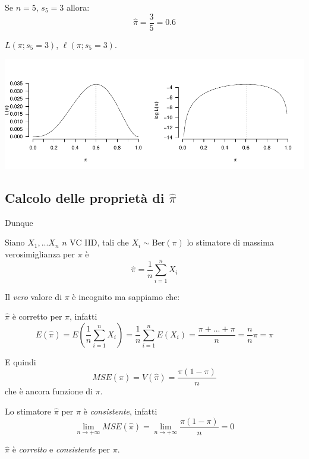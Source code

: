 \documentclass[
  11pt,
]{book}
\theoremstyle{mytheoremstyle}
\theoremstyle{mydefstyle}
\begin{document}
Se \(n=5\), \(s_5=3\) allora:
\[\hat\pi=\frac{3}{5}=0.6\]

\(L(\pi;s_5=3)\), \(\ell(\pi;s_5=3)\).

\begin{center}\includegraphics{Appunti_di_Statistica_2025_files/figure-latex/12-Verosimiglianza-12-1} \end{center}

\subsection{\texorpdfstring{Calcolo delle proprietà di \(\hat\pi\)}{Calcolo delle proprietà di \textbackslash hat\textbackslash pi}}\label{calcolo-delle-proprietuxe0-di-hatpi}

Dunque

\begin{info}
Siano \(X_1,...X_n\) \(n\) VC IID, tali che \(X_i\sim\text{Ber}(\pi)\) lo stimatore
di massima verosimiglianza per \(\pi\) è
\[\hat \pi=\frac 1n \sum_{i=1}^nX_i\]

\end{info}

Il \emph{vero} valore di \(\pi\) è incognito ma sappiamo che:

\begin{info}
\(\hat\pi\) è corretto per \(\pi\), infatti
\[E(\hat\pi)=E\left(\frac{1}n\sum_{i=1}^n X_i\right)=\frac{1}n\sum_{i=1}^nE(X_i)=\frac{\pi+...+\pi}{n}=\frac n n\pi=\pi\]

E quindi
\[MSE(\hat\pi)=V(\hat\pi)=\frac{\pi(1-\pi)}{n}\]
che è ancora funzione di \(\pi\).

\end{info}

\begin{info}
Lo stimatore \(\hat\pi\) per \(\pi\) è \emph{consistente}, infatti
\[\lim_{n\to +\infty}MSE(\hat\pi)=\lim_{n\to +\infty}\frac{\pi(1-\pi)}{n}=0\]

\(\hat\pi\) è \emph{corretto} e \emph{consistente} per \(\pi\).

\end{info}
\end{document}
